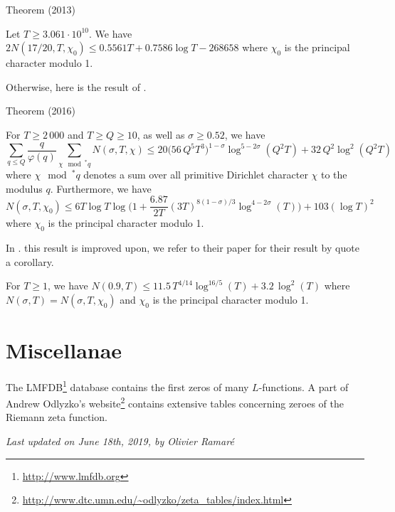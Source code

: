 \par 
\begin{thm}{Theorem (2013)}

  Let $T\ge3.061\cdot10^{10}$. We have
  $
    2N(17/20,T,\chi_0)\le 0.5561T+0.7586\log T-268 658
  $
  where $\chi_0$ is the principal character modulo 1.
\end{thm}


Otherwise, here is the result of
\cite{Ramare*13d}.
\par 

\begin{thm}{Theorem (2016)}

  For $T\ge2\,000$ and $T\ge Q\ge10$, as well as $\sigma\ge0.52$, we have 
  $$
    \sum_{q\le Q}\frac{q}{\varphi(q)}
    \sum_{\chi\mod^* q}N(\sigma,T,\chi)
    \le 
    20\bigl(56\,Q^{5}T^3\bigr)^{1-\sigma}\log^{5-2\sigma}(Q^2T)
    +32\,Q^2\log^2(Q^2T)
  $$
  where $\chi\mod^* q$ denotes a sum over all primitive Dirichlet character
  $\chi$ to the modulus $q$. Furthermore, we have
  $$
    N(\sigma,T,\chi_0)\le 6T\log T
    \log\biggl(1+\frac{6.87}{2T}(3T)^{8(1-\sigma)/{3}}\log^{4-2\sigma}(T)\biggr)
    +103(\log T)^2
  $$
  where $\chi_0$ is the principal character modulo 1.
\end{thm}

In
\cite{Kadiri-Lumley-Ng*18}.
this result is improved upon, we refer to their paper for their result
by quote a corollary.


  For $T\ge1$, we have 
  $
    N(0.9,T)
    \le 
    11.5\, T^{4/14}\log^{16/5}(T)
    +3.2\,\log^2(T)
  $
  where $N(\sigma,T)=N(\sigma,T,\chi_0)$ and $\chi_0$ is the principal character modulo 1.


\section{Miscellanae}



The LMFDB\footnote{\url{http://www.lmfdb.org}} database contains the first zeros
of many $L$-functions. A part of Andrew Odlyzko's 
website\footnote{\url{http://www.dtc.umn.edu/~odlyzko/zeta_tables/index.html}}
contains extensive tables concerning zeroes of the Riemann zeta function.




 
 







  
\begin{flushright}\small\sl{}   Last updated on June 18th, 2019, by Olivier Ramar\'e
 \end{flushright}














